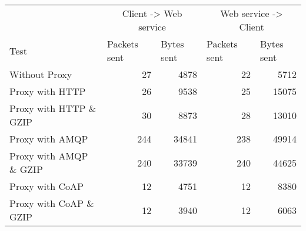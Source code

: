 \begin{tabular}{lrrrr}
\hline
\multicolumn{1}{l}{}                  & \multicolumn{2}{c}{Client -> Web service}                           & \multicolumn{2}{c}{Web service -> Client}                           \\
\multicolumn{1}{l}{Test} & \multicolumn{1}{l}{Packets sent} & \multicolumn{1}{l}{Bytes sent} & \multicolumn{1}{l}{Packets sent} & \multicolumn{1}{l}{Bytes sent} \\ \hline
Without Proxy                   & 27             & 4878           & 22             & 5712           \\
Proxy with HTTP                 & 26             & 9538           & 25             & 15075          \\
Proxy with HTTP \& GZIP         & 30             & 8873           & 28             & 13010          \\
Proxy with AMQP                 & 244            & 34841          & 238            & 49914          \\
Proxy with AMQP \& GZIP         & 240            & 33739          & 240            & 44625          \\
Proxy with CoAP                 & 12             & 4751           & 12             & 8380           \\
Proxy with CoAP \& GZIP         & 12             & 3940           & 12             & 6063           \\
\end{tabular}